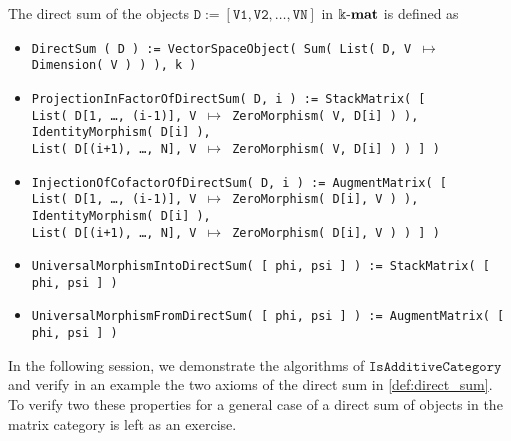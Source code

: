 \begin{computation}
The direct sum of the objects $\mathtt{D := [ V1, V2, \dots, VN ]}$ in $\Bbbk\textnormal{-}\mathbf{mat}$ is defined as
\begin{itemize}
\item \texttt{DirectSum ( D ) := VectorSpaceObject( Sum( List( D, V $\mapsto$ Dimension( V ) ) ), k )}
\item \texttt{ProjectionInFactorOfDirectSum( D, i ) := StackMatrix( [ \\
\phantom{x}\hspace{3ex}List( D[1, \dots, (i-1)], V $\mapsto$ ZeroMorphism( V, D[i] ) ), \\
\phantom{x}\hspace{3ex}IdentityMorphism( D[i] ), \\
\phantom{x}\hspace{3ex}List( D[(i+1), \dots, N], V $\mapsto$ ZeroMorphism( V, D[i] ) ) ] )}
\item \texttt{InjectionOfCofactorOfDirectSum( D, i ) := AugmentMatrix( [ \\
\phantom{x}\hspace{3ex}List( D[1, \dots, (i-1)], V $\mapsto$ ZeroMorphism( D[i], V ) ), \\
\phantom{x}\hspace{3ex}IdentityMorphism( D[i] ), \\
\phantom{x}\hspace{3ex}List( D[(i+1), \dots, N], V $\mapsto$ ZeroMorphism( D[i], V ) ) ] )}
\item \texttt{UniversalMorphismIntoDirectSum( [ phi, psi ] ) := StackMatrix( [ phi, psi ] )}
\item \texttt{UniversalMorphismFromDirectSum( [ phi, psi ] ) := AugmentMatrix( [ phi, psi ] )}
\end{itemize}

In the following \Gap{} session, we demonstrate the algorithms of $\mathtt{IsAdditiveCategory}$ and verify in
an example the two axioms of the direct sum in \ref{def:direct_sum}. To verify two these properties for a general case
of a direct sum of objects in the matrix category is left as an exercise.


\end{computation}
